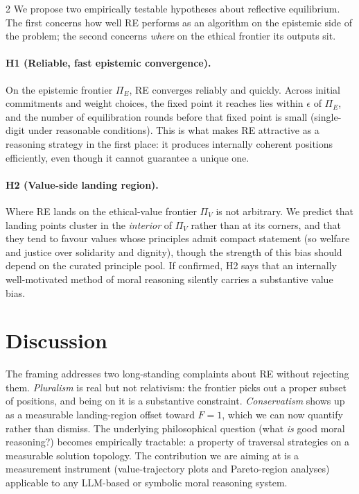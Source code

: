 \documentclass[10pt]{article}
\begin{document}
\begin{multicols}{2}
We propose two empirically testable hypotheses about reflective equilibrium.
The first concerns how well RE performs as an algorithm on the epistemic side
of the problem; the second concerns \emph{where} on the ethical frontier its
outputs sit.

\paragraph{H1 (Reliable, fast epistemic convergence).} On the epistemic
frontier $\Pi_E$, RE converges reliably and quickly. Across initial commitments
and weight choices, the fixed point it reaches lies within $\epsilon$ of
$\Pi_E$, and the number of equilibration rounds before that fixed point is
small (single-digit under reasonable conditions). This is what makes RE
attractive as a reasoning strategy in the first place: it produces internally
coherent positions efficiently, even though it cannot guarantee a unique one.

\paragraph{H2 (Value-side landing region).} Where RE lands on the
ethical-value frontier $\Pi_V$ is not arbitrary. We predict that landing
points cluster in the \emph{interior} of $\Pi_V$ rather than at its corners,
and that they tend to favour values whose principles admit compact statement
(so welfare and justice over solidarity and dignity), though the strength of
this bias should depend on the curated principle pool. If
confirmed, H2 says that an internally well-motivated method of moral reasoning
silently carries a substantive value bias.

\section{Discussion}

The framing addresses two long-standing complaints about RE without rejecting
them. \emph{Pluralism} is real but not relativism: the frontier picks out a
proper subset of positions, and being on it is a substantive constraint.
\emph{Conservatism} shows up as a measurable landing-region offset toward
$F=1$, which we can now quantify rather than dismiss. The underlying
philosophical question (what \emph{is} good moral reasoning?) becomes
empirically tractable: a property of traversal strategies on a measurable
solution topology. The contribution we are aiming at is a measurement
instrument (value-trajectory plots and Pareto-region analyses) applicable
to any LLM-based or symbolic moral reasoning system.


\end{multicols}
\end{document}
